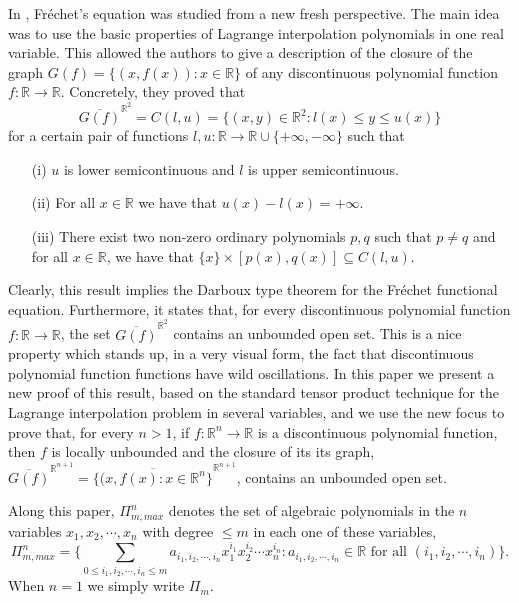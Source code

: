 \documentclass[10pt,a4paper]{amsart}
\theoremstyle{definition}
\begin{document}
In \cite{almira_antonio}, \cite{AK_MJM} Fr\'{e}chet's equation was studied from a new fresh perspective. The main idea was to use the basic properties of Lagrange interpolation polynomials in one real variable. This allowed the authors to give a description of the closure of the graph $G(f)=\{(x,f(x)):x\in\mathbb{R}\}$ of any discontinuous polynomial function$f:\mathbb{R}\to\mathbb{R}$. Concretely, they proved that
\begin{equation}\label{grafo}
\overline{G(f)}^{\mathbb{R}^2}=C(l,u)=\{(x,y)\in\mathbb{R}^2: l(x)\leq y\leq u(x)\}
\end{equation}
for a certain  pair of functions  $l,u:\mathbb{R}\to\mathbb{R}\cup\{+\infty,-\infty\}$ such that
\begin{itemize}
\item[(i)] $u$ is lower semicontinuous and $l$ is upper semicontinuous.
\item[(ii)] For all $x\in \mathbb{R}$ we have that $u(x)-l(x)=+\infty$.
\item[(iii)] There exist two non-zero ordinary polynomials $p,q$ such that $p\neq q$ and for all $x\in\mathbb{R}$, we have that  $\{x\}\times [p(x),q(x)]\subseteq C(l,u)$.                                           
\end{itemize}
Clearly, this result implies the Darboux type theorem for the Fr\'{e}chet functional equation. Furthermore, it states that, for every discontinuous polynomial function$f:\mathbb{R}\to\mathbb{R}$, the set $\overline{G(f)}^{\mathbb{R}^2}$ contains an unbounded open set. This is a nice property which stands up, in a very visual form, the fact that discontinuous polynomial function functions have wild oscillations. In this paper we present a new proof of this result, based on the standard  tensor product technique for the Lagrange interpolation problem in several variables, and we use the new focus to prove that, for every $n>1$, if $f:\mathbb{R}^n\to\mathbb{R}$ is a discontinuous polynomial function, then $f$ is locally unbounded and  the closure of its its graph, $\overline{G(f)}^{\mathbb{R}^{n+1}}=\overline{\{(x,f(x):x\in\mathbb{R}^n\}}^{\mathbb{R}^{n+1}}$, contains an unbounded open set. 

Along this paper,  $\Pi_{m,max}^n$ denotes the set of algebraic polynomials in the $n$ variables $x_1,x_2,\cdots,x_n$ with degree $\leq m$ in each one of these variables,
\[
\Pi_{m,max}^n=\{\sum_{0\leq i_1,i_2,\cdots,i_n\leq m}a_{i_1,i_2,\cdots,i_n}x_1^{i_1}x_2^{i_2}\cdots x_{n}^{i_n}:a_{i_1,i_2,\cdots,i_n}\in\mathbb{R}\text{ for all } (i_1,i_2,\cdots,i_n)\}.
\] 
When $n=1$ we simply write $\Pi_m$. 
\end{document}

